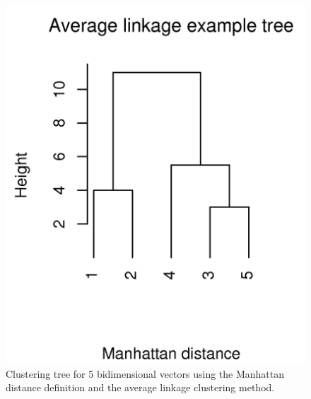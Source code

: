\begin{figure}[t]
\centering
\includegraphics[scale=0.4]{Appendix/appendixtree.png}
\caption{Clustering  tree  for   5  bidimensional  vectors  using  the
  Manhattan  distance definition  and the  average  linkage clustering
  method.}
\label{fig:tree}
\end{figure}







